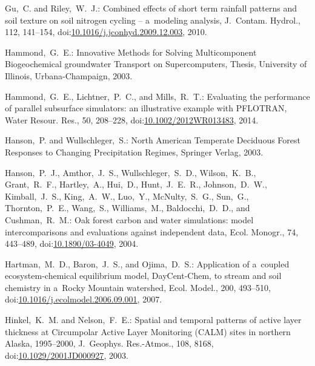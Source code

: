 \documentclass[gmd,noline]{copernicus}
\begin{document}
\begin{thebibliography}{55}
Gu,~C. and Riley,~W.~J.:
Combined effects of short term rainfall patterns and soil texture on soil nitrogen cycling -- a~modeling analysis,
J.~Contam. Hydrol.,
112, 141--154,
doi:\href{http://dx.doi.org/10.1016/j.jconhyd.2009.12.003}{10.1016/j.jconhyd.2009.12.003}, 2010.


Hammond,~G.~E.:
Innovative Methods for Solving Multicomponent Biogeochemical groundwater Transport on Supercomputers,
Thesis,
University of Illinois, Urbana-Champaign, 2003.


Hammond,~G.~E., Lichtner,~P.~C., and Mills,~R.~T.:
Evaluating the performance of parallel subsurface simulators: an illustrative example with PFLOTRAN,
Water Resour. Res.,
50, 208--228,
doi:\href{http://dx.doi.org/10.1002/2012WR013483}{10.1002/2012WR013483}, 2014.


Hanson,~P. and Wullschleger,~S.:
North American Temperate Deciduous Forest Responses to Changing Precipitation Regimes,
Springer Verlag,  2003.


Hanson,~P.~J., Amthor,~J.~S., Wullschleger,~S.~D., Wilson,~K.~B.,
Grant,~R.~F., Hartley,~A., Hui,~D., Hunt,~J.~E.~R., Johnson,~D.~W.,
Kimball,~J.~S., King,~A.~W., Luo,~Y., McNulty,~S.~G., Sun,~G.,
Thornton,~P.~E., Wang,~S., Williams,~M., Baldocchi,~D.~D., and
Cushman,~R.~M.: Oak forest carbon and water simulations: model
intercomparisons and evaluations against independent data, Ecol. Monogr., 74,
443--489, doi:\href{http://dx.doi.org/10.1890/03-4049}{10.1890/03-4049},
2004.


Hartman,~M.~D., Baron,~J.~S., and Ojima,~D.~S.:
Application of a~coupled ecosystem-chemical equilibrium model, DayCent-Chem, to stream and soil chemistry in a~Rocky Mountain watershed,
Ecol. Model.,
200, 493--510,
doi:\href{http://dx.doi.org/10.1016/j.ecolmodel.2006.09.001}{10.1016/j.ecolmodel.2006.09.001}, 2007.





Hinkel,~K.~M. and Nelson,~F.~E.:
Spatial and temporal patterns of active layer thickness at Circumpolar Active Layer Monitoring (CALM) sites in northern Alaska, 1995--2000,
J.~Geophys. Res.-Atmos.,
108, 8168,
doi:\href{http://dx.doi.org/10.1029/2001JD000927}{10.1029/2001JD000927}, 2003.


\end{thebibliography}
\end{document}
